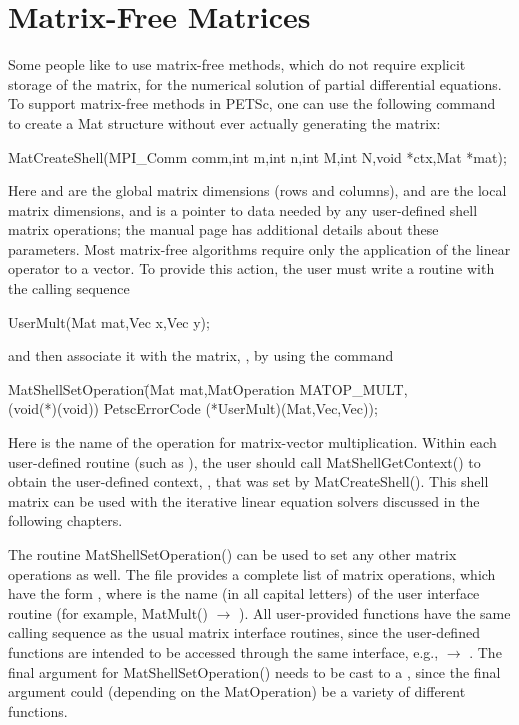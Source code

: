 \section{Matrix-Free Matrices} 
\label{sec_matrixfree}
Some people like to use matrix-free methods, which do not require
explicit storage of the matrix, for the numerical solution of partial
differential equations.  To support matrix-free methods in PETSc, one
can use the following command to create a Mat structure without
ever actually generating the matrix:
\begin{tabbing}
  MatCreateShell(MPI\_Comm comm,int m,int n,int M,int N,void *ctx,Mat *mat);
\end{tabbing}
Here  and  are the global matrix dimensions (rows and
columns),  and  are the local matrix dimensions, and
 is a pointer to data needed by any user-defined shell matrix
operations; the manual page has additional details about these
parameters.  Most matrix-free algorithms require only the application
of the linear operator to a vector. To provide this action, the user
must write a routine with the calling sequence
\begin{tabbing}
  UserMult(Mat mat,Vec x,Vec y);
\end{tabbing}
and then associate it with the matrix, , by using the 
command 
\begin{tabbing}
  MatShellSetOperation\=(Mat mat,MatOperation MATOP\_MULT,\\
                      \>         (void(*)(void)) PetscErrorCode (*UserMult)(Mat,Vec,Vec));
\end{tabbing}
Here  is the name of the operation for matrix-vector
multiplication. Within each user-defined routine (such as
), the user should call 
MatShellGetContext() to obtain the user-defined context, ,
that was set by MatCreateShell().
This shell matrix can be used with the iterative linear
equation solvers discussed in the following chapters.

The routine MatShellSetOperation() can be used to set any other
matrix operations as well.  The file 
 provides a complete list of matrix
operations, which have the form , where  is the name (in all capital letters) of the user
interface routine (for example, MatMult() $ \to $ ).  All
user-provided functions have the same calling sequence as the
usual matrix interface routines, since the user-defined functions are
intended to be accessed through the same interface, e.g., 
 $ \to$ .
The final argument for MatShellSetOperation() needs to be cast
to a , since the final argument could (depending on the 
MatOperation) be a variety of different functions.

